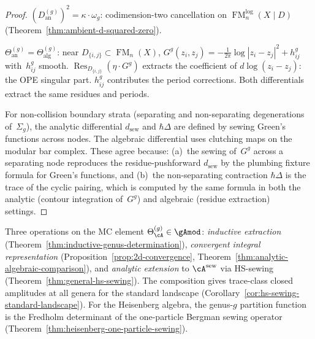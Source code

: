 \begin{proof}
$(D_{\mathrm{an}}^{(g)})^2 = \kappa \cdot \omega_g$:
codimension-two cancellation on
$\operatorname{FM}_n^{\log}(X\mathbin{|}D)$
(Theorem~\ref{thm:ambient-d-squared-zero}).

$\Theta_{\mathrm{an}}^{(g)} = \Theta_{\mathrm{alg}}^{(g)}$:
near $D_{\{i,j\}} \subset \operatorname{FM}_n(X)$,
$G^g(z_i, z_j) = -\frac{1}{2\pi}\log|z_i - z_j|^2 + h_{ij}^g$
with~$h_{ij}^g$ smooth.
$\operatorname{Res}_{D_{\{i,j\}}}(\eta \cdot G^g)$
extracts the coefficient of $d\log(z_i - z_j)$: the OPE
singular part.  $h_{ij}^g$ contributes the period corrections.
Both differentials extract the same residues and periods.

For non-collision boundary strata (separating and non-separating
degenerations of~$\Sigma_g$), the analytic differential
$d_{\mathrm{sew}}$ and $\hbar\Delta$ are defined by sewing Green's
functions across nodes.  The algebraic differential uses clutching maps
on the modular bar complex.  These agree because:
(a)~the sewing of~$G^g$ across a separating node reproduces the
residue-pushforward $d_{\mathrm{sew}}$ by the plumbing fixture formula
for Green's functions, and
(b)~the non-separating contraction $\hbar\Delta$ is the trace of the
cyclic pairing, which is computed by the same formula in both the
analytic (contour integration of~$G^g$) and algebraic (residue
extraction) settings.
\end{proof}

\begin{remark}
\label{rem:mc5-analytic-chain}
Three operations on the MC element $\Theta^{(g)}_\cA \in \gAmod$:
\emph{inductive extraction}
(Theorem~\ref{thm:inductive-genus-determination}),
\emph{convergent integral representation}
(Proposition~\ref{prop:2d-convergence},
Theorem~\ref{thm:analytic-algebraic-comparison}), and
\emph{analytic extension} to $\cA^{\mathrm{sew}}$ via
HS-sewing (Theorem~\ref{thm:general-hs-sewing}).
The composition gives trace-class closed amplitudes at all genera
for the standard landscape
(Corollary~\ref{cor:hs-sewing-standard-landscape}).
For the Heisenberg algebra, the genus-$g$ partition function
is the Fredholm determinant of the one-particle Bergman sewing
operator (Theorem~\ref{thm:heisenberg-one-particle-sewing}).
\end{remark}


